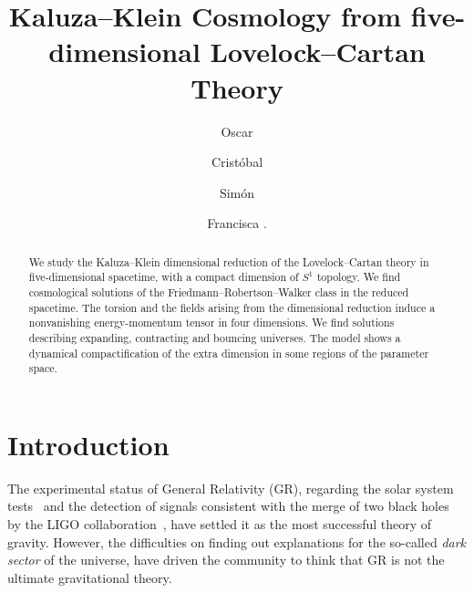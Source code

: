 \documentclass[aps,prd,12pt,superscriptaddress,showpacs,showkeys,reprint,nofootinbib]{revtex4-1}
\begin{document}
\title{Kaluza--Klein Cosmology from five-dimensional Lovelock--Cartan Theory}

\author{Oscar }

\author{Crist\'obal }

\author{Sim\'on }

\author{Francisca .}


\begin{abstract}
  We study the Kaluza--Klein dimensional reduction of the Lovelock--Cartan theory in five-dimensional spacetime, with a compact dimension of $S^1$ topology. We find cosmological solutions of the Friedmann--Robertson--Walker class in the reduced spacetime. The torsion and the fields arising from the dimensional reduction induce a nonvanishing energy-momentum tensor in four dimensions. We find solutions describing expanding, contracting and bouncing universes. The model shows a dynamical compactification of the extra dimension in some regions of the parameter space. 
\end{abstract}



\maketitle

\section{Introduction}


The experimental status of General Relativity (GR), regarding the solar system tests~\cite{Will:2014kxa} and the detection of signals consistent with the merge of two black holes by the LIGO collaboration~\cite{Abbott:2016blz,*Abbott:2016nmj}, have settled it as the most successful theory of gravity. However, the difficulties on finding out explanations for the so-called \emph{dark sector} of the universe, have driven the community to think that GR is not the ultimate gravitational theory. 
\end{document}

